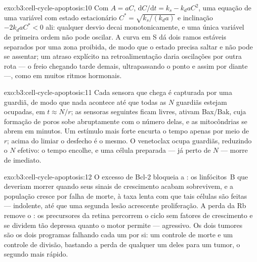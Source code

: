 \begin{solution}{exo:b3:cell-cycle-apoptosis:10}
Com $A = aC$, $\mathrm{d}C/\mathrm{d}t = k_{s} - k_{d}aC^{2}$, uma
equação de uma variável com estado estacionário
$C^{*} = \sqrt{k_{s}/(k_{d}a)}$ e inclinação $-2k_{d}aC^{*} < 0$ ali:
qualquer desvio decai monotonicamente, e uma única variável de primeira
ordem não pode oscilar. A curva em S dá dois ramos estáveis separados
por uma zona proibida, de modo que o estado precisa saltar e não pode
se assentar; um atraso explícito na retroalimentação daria oscilações
por outra rota --- o freio chegando tarde demais, ultrapassando o ponto
e assim por diante ---, como em muitos ritmos hormonais.
\end{solution}

\begin{solution}{exo:b3:cell-cycle-apoptosis:11}
Cada sensora que chega é capturada por uma guardiã, de modo que nada
acontece até que todas as $N$ guardiãs estejam ocupadas, em
$t \approx N/r$; as sensoras seguintes ficam livres, ativam Bax/Bak,
cuja formação de poros sobe abruptamente com o número delas, e as
mitocôndrias se abrem em minutos. Um estímulo mais forte encurta o
tempo apenas por meio de $r$; acima do limiar o desfecho é o mesmo. O
venetoclax ocupa guardiãs, reduzindo o $N$ efetivo: o tempo encolhe, e
uma célula preparada --- já perto de $N$ --- morre de imediato.
\end{solution}

\begin{solution}{exo:b3:cell-cycle-apoptosis:12}
O excesso de Bcl-2 bloqueia a : os linfócitos~B que
deveriam morrer quando seus sinais de crescimento acabam sobrevivem, e
a população cresce por falha de morte, à taxa lenta com que tais
células são feitas --- indolente, até que uma segunda lesão acrescente
proliferação. A perda da Rb remove o : os precursores
da retina percorrem o ciclo sem fatores de crescimento e se dividem tão
depressa quanto o motor permite --- agressivo. Os dois tumores são os
dois programas falhando cada um por si: um controle de morte e um
controle de divisão, bastando a perda de qualquer um deles para um
tumor, o segundo mais rápido.
\end{solution}

